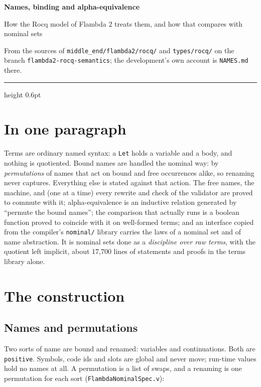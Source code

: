 \documentclass[10pt,a4paper]{article}
\newcommand\code[1]{\texttt{#1}}
\newcommand\file[1]{\texttt{\color{soft}#1}}
\begin{document}
{\fontsize{24}{28}\selectfont\bfseries Names, binding and alpha-equivalence\par}
\vspace{0.2em}
{\large\color{soft} How the Rocq model of Flambda 2 treats them, and how that
compares with nominal sets\par}
\vspace{0.4em}
{\small\color{faint} From the sources of \code{middle\_end/flambda2/rocq/} and
\code{types/rocq/} on the branch \code{flambda2-rocq-semantics}; the
development's own account is \code{NAMES.md} there.\par}
\vspace{0.3em}
{\color{rule}\hrule height 0.6pt}

\section*{In one paragraph}

Terms are ordinary named syntax: a \code{Let} holds a variable and a body, and
nothing is quotiented. Bound names are handled the nominal way: by
\emph{permutations} of names that act on bound and free occurrences alike, so
renaming never captures. Everything else is stated against that action. The
free names, the machine, and (one at a time) every rewrite and check of the
validator are proved to commute with it; alpha-equivalence is an inductive
relation generated by ``permute the bound names''; the comparison that actually
runs is a boolean function proved to coincide with it on well-formed terms; and
an interface copied from the compiler's \code{nominal/} library carries the laws
of a nominal set and of name abstraction. It is nominal sets done as a
\emph{discipline over raw terms}, with the quotient left implicit, about
17,700 lines of statements and proofs in the terms library alone.

\section{The construction}

\subsection{Names and permutations}

Two sorts of name are bound and renamed: variables and continuations. Both are
\code{positive}. Symbols, code ids and slots are global and never move; run-time
values hold no names at all. A permutation is a list of swaps, and a renaming is
one permutation for each sort (\file{FlambdaNominalSpec.v}):
\end{document}
